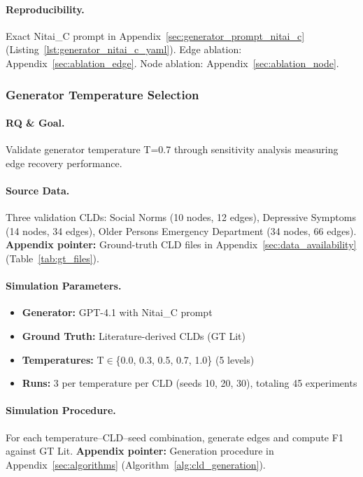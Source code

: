 \paragraph{Reproducibility.}
Exact Nitai\_C prompt in Appendix~\ref{sec:generator_prompt_nitai_c} (Listing~\ref{lst:generator_nitai_c_yaml}). Edge ablation: Appendix~\ref{sec:ablation_edge}. Node ablation: Appendix~\ref{sec:ablation_node}.

\subsubsection{Generator Temperature Selection}

\paragraph{RQ \& Goal.}
Validate generator temperature T=0.7 through sensitivity analysis measuring edge recovery performance.

\paragraph{Source Data.}
Three validation CLDs: Social Norms (10 nodes, 12 edges), Depressive Symptoms (14 nodes, 34 edges), Older Persons Emergency Department (34 nodes, 66 edges).
\textbf{Appendix pointer:} Ground-truth CLD files in Appendix~\ref{sec:data_availability} (Table~\ref{tab:gt_files}).

\paragraph{Simulation Parameters.}
\begin{itemize}[noitemsep]
    \item \textbf{Generator:} GPT-4.1 with Nitai\_C prompt
    \item \textbf{Ground Truth:} Literature-derived CLDs (GT Lit)
    \item \textbf{Temperatures:} T$\in$\{0.0, 0.3, 0.5, 0.7, 1.0\} (5 levels)
    \item \textbf{Runs:} 3 per temperature per CLD (seeds 10, 20, 30), totaling 45 experiments
\end{itemize}

\paragraph{Simulation Procedure.}
For each temperature--CLD--seed combination, generate edges and compute F1 against GT Lit.
\textbf{Appendix pointer:} Generation procedure in Appendix~\ref{sec:algorithms} (Algorithm~\ref{alg:cld_generation}).

